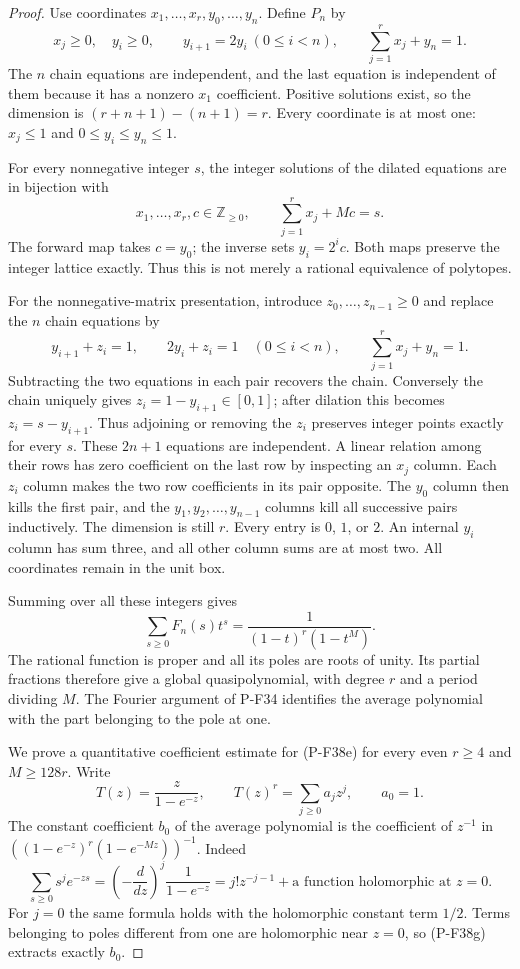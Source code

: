 \begin{proof}
Use coordinates
$x_1,\ldots,x_r,y_0,\ldots,y_n$. Define $P_n$ by
\[
 x_j\ge0,\quad y_i\ge0,\qquad
 y_{i+1}=2y_i\ (0\le i<n),\qquad
 \sum_{j=1}^{r}x_j+y_n=1.
 \tag{P-F38c}
\]
The $n$ chain equations are independent, and the last equation
is independent of them because it has a nonzero $x_1$
coefficient. Positive solutions exist, so the dimension is
$(r+n+1)-(n+1)=r$. Every coordinate is at most one:
$x_j\le1$ and $0\le y_i\le y_n\le1$.

For every nonnegative integer $s$, the integer solutions of
the dilated equations are in bijection with
\[
 x_1,\ldots,x_r,c\in\mathbb Z_{\ge0},
 \qquad \sum_{j=1}^{r}x_j+Mc=s.
 \tag{P-F38d}
\]
The forward map takes $c=y_0$; the inverse sets $y_i=2^ic$.
Both maps preserve the integer lattice exactly. Thus this is
not merely a rational equivalence of polytopes.

For the nonnegative-matrix presentation, introduce
$z_0,\ldots,z_{n-1}\ge0$ and replace the $n$ chain equations by
\[
 y_{i+1}+z_i=1,\qquad 2y_i+z_i=1\quad(0\le i<n),
 \qquad \sum_{j=1}^{r}x_j+y_n=1.
 \tag{P-F38d'}
\]
Subtracting the two equations in each pair recovers the
chain. Conversely the chain uniquely gives
$z_i=1-y_{i+1}\in[0,1]$; after dilation this becomes
$z_i=s-y_{i+1}$. Thus adjoining or removing the $z_i$
preserves integer points exactly for every $s$.
These $2n+1$ equations are independent. A linear relation
among their rows has zero coefficient on the last row
by inspecting an $x_j$ column. Each $z_i$ column makes
the two row coefficients in its pair opposite.
The $y_0$ column then kills the first pair, and the
$y_1,y_2,\ldots,y_{n-1}$ columns kill all successive
pairs inductively. The dimension is still $r$.
Every entry is $0$, $1$, or $2$. An internal $y_i$
column has sum three, and all other column sums are
at most two. All coordinates remain in the unit box.

Summing over all these integers gives
\[
 \sum_{s\ge0}F_n(s)t^s
          =\frac1{(1-t)^r(1-t^M)}.
 \tag{P-F38e}
\]
The rational function is proper and all its poles are roots
of unity. Its partial fractions therefore give a global
quasipolynomial, with degree $r$ and a period dividing $M$.
The Fourier argument of P-F34 identifies the average
polynomial with the part belonging to the pole at one.

We prove a quantitative coefficient estimate for (P-F38e)
for every even $r\ge4$ and $M\ge128r$. Write
\[
 T(z)=\frac{z}{1-e^{-z}},\qquad
 T(z)^r=\sum_{j\ge0}a_jz^j,\qquad a_0=1.
 \tag{P-F38f}
\]
The constant coefficient $b_0$ of the average polynomial
is the coefficient of $z^{-1}$ in
$((1-e^{-z})^r(1-e^{-Mz}))^{-1}$.
Indeed
\[
 \sum_{s\ge0}s^je^{-zs}
       =\left(-\frac{d}{dz}\right)^j\frac1{1-e^{-z}}
       =j!z^{-j-1}+\text{a function holomorphic at }z=0.
 \tag{P-F38g}
\]
For $j=0$ the same formula holds with the holomorphic
constant term $1/2$. Terms belonging to poles different
from one are holomorphic near $z=0$, so (P-F38g)
extracts exactly $b_0$.


\end{proof}
